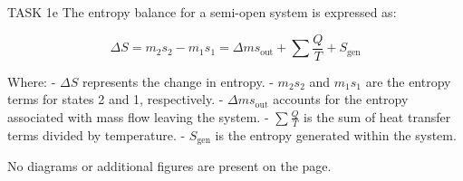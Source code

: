 TASK 1e  
The entropy balance for a semi-open system is expressed as:  

\[
\Delta S = m_2 s_2 - m_1 s_1 = \Delta m s_{\text{out}} + \sum \frac{Q}{T} + S_{\text{gen}}
\]  

Where:  
- \( \Delta S \) represents the change in entropy.  
- \( m_2 s_2 \) and \( m_1 s_1 \) are the entropy terms for states 2 and 1, respectively.  
- \( \Delta m s_{\text{out}} \) accounts for the entropy associated with mass flow leaving the system.  
- \( \sum \frac{Q}{T} \) is the sum of heat transfer terms divided by temperature.  
- \( S_{\text{gen}} \) is the entropy generated within the system.  

No diagrams or additional figures are present on the page.